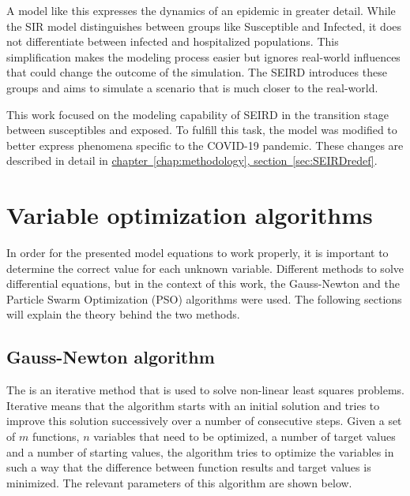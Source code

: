 A model like this expresses the dynamics of an epidemic in greater detail. While the SIR model distinguishes between
groups like Susceptible and Infected, it does not differentiate between infected and hospitalized populations. This simplification
makes the modeling process easier but ignores real-world influences that could change the outcome of the simulation.
The SEIRD introduces these groups and aims to simulate a scenario that is much closer to the real-world.\newline

This work focused on the modeling capability of SEIRD in the transition stage between susceptibles and exposed. To fulfill this
task, the model was modified to better express phenomena specific to the COVID-19 pandemic. These changes are described in detail
in \hyperref[sec:SEIRDredef]{chapter~\ref*{chap:methodology}, section~\ref*{sec:SEIRDredef}}.


\section{Variable optimization algorithms}
In order for the presented model equations to work properly, it is important to determine the correct value for each unknown variable.
Different methods to solve differential equations, but in the context of this work, the Gauss-Newton and the Particle Swarm Optimization (PSO)
algorithms were used. The following sections will explain the theory behind the two methods.


\subsection{Gauss-Newton algorithm}
\label{sec:Gauss}
The  is an iterative method that is used to solve non-linear least squares problems. Iterative means that the algorithm 
starts with an initial solution and tries to improve this solution successively over a number of consecutive steps.
Given a set of $m$ functions, $n$ variables that need to be optimized, a number of target values and a number of starting values, the algorithm tries
to optimize the variables in such a way that the difference between function results and target values is minimized.
The relevant parameters of this algorithm are shown below. 

